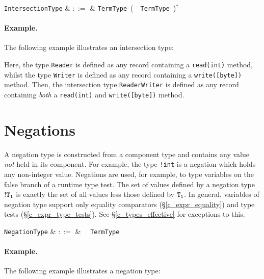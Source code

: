 \begin{syntax}
  \verb+IntersectionType+ & $::=$ & \verb+TermType+\ \big(\ \token{\&}\ \verb+TermType+\
  \big)$^*$\\
\end{syntax}

\paragraph{Example.} The following example illustrates an intersection type:



Here, the type \lstinline{Reader} is defined as any record containing a \lstinline{read(int)} method, whilst the type \lstinline{Writer} is defined as any record containing a \lstinline{write([byte])} method.  Then, the intersection type \lstinline{ReaderWriter} is defined as any record containing {\em both} a \lstinline{read(int)} and \lstinline{write([byte])} method.


\section{Negations}
\label{c_types_negations}

A negation type is constructed from a component type and contains any value {\em not} held in its component.  For example, the type \lstinline{!int} is a negation which holds any non-integer value.  Negations are used, for example, to type variables on the false branch of a runtime type test.  The set of values defined by a negation type ${\tt !T_1}$ is exactly the set of all values less those defined by ${\tt T_1}$.  In general, variables of negation type support only equality comparators (\S\ref{c_expr_equality}) and type tests (\S\ref{c_expr_type_tests}).  See \S\ref{c_types_effective} for exceptions to this.

\begin{syntax}
  \verb+NegationType+ & $::=$ & \token{!}\ \ \verb+TermType+\\
\end{syntax}

\paragraph{Example.} The following example illustrates a negation type:

